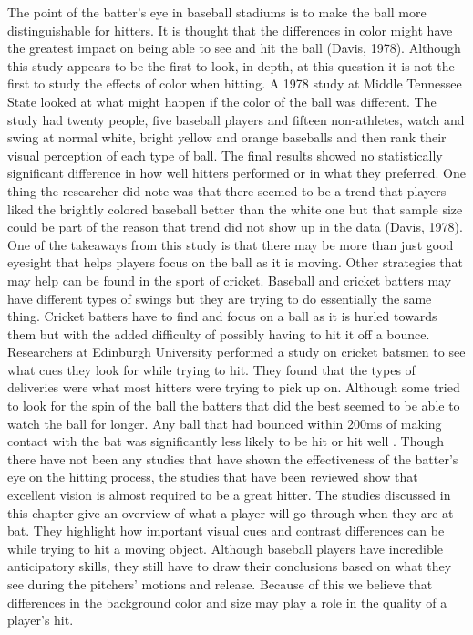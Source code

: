 \documentclass{article}
\begin{document}
\begin{doublespace}
The point of the batter’s eye in baseball stadiums is to make the ball more distinguishable for hitters. It is thought that the differences in color might have the greatest impact on being able to see and hit the ball (Davis, 1978). Although this study appears to be the first to look, in depth, at this question it is not the first to study the effects of color when hitting. A 1978 study at Middle Tennessee State looked at what might happen if the color of the ball was different. The study had twenty people, five baseball players and fifteen non-athletes, watch and swing at normal white, bright yellow and orange baseballs and then rank their visual perception of each type of ball. The final results showed no statistically significant difference in how well hitters performed or in what they preferred. One thing the researcher did note was that there seemed to be a trend that players liked the brightly colored baseball better than the white one but that sample size could be part of the reason that trend did not show up in the data (Davis, 1978). One of the takeaways from this study is that there may be more than just good eyesight that helps players focus on the ball as it is moving. Other strategies that may help can be found in the sport of cricket. Baseball and cricket batters may have different types of swings but they are trying to do essentially the same thing. Cricket batters have to find and focus on a ball as it is hurled towards them but with the added difficulty of possibly having to hit it off a bounce. Researchers at Edinburgh University performed a study on cricket batsmen to see what cues they look for while trying to hit. They found that the types of deliveries were what most hitters were trying to pick up on. Although some tried to look for the spin of the ball the batters that did the best seemed to be able to watch the ball for longer. Any ball that had bounced within 200ms of making contact with the bat was significantly less likely to be hit or hit well \citep{Renshaw}.
Though there have not been any studies that have shown the effectiveness of the batter’s eye on the hitting process, the studies that have been reviewed show that excellent vision is almost required to be a great hitter. The studies discussed in this chapter give an overview of what a player will go through when they are at-bat. They highlight how important visual cues and contrast differences can be while trying to hit a moving object. Although baseball players have incredible anticipatory skills, they still have to draw their conclusions based on what they see during the pitchers’ motions and release. Because of this we believe that differences in the background color and size may play a role in the quality of a player’s hit.
\pagebreak

\end{doublespace}
\end{document}
